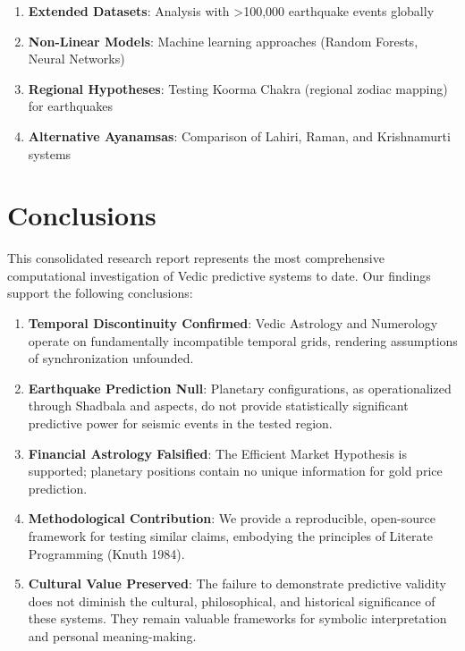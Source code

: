 \documentclass[
  11pt,
  a4paper,
  oneside,
  openany]{article}
\providecommand{\tightlist}{%
  \setlength{\itemsep}{0pt}\setlength{\parskip}{0pt}}\usepackage{longtable,booktabs,array}
\begin{document}
\begin{enumerate}
\def\labelenumi{\arabic{enumi}.}
\tightlist
\item
  \textbf{Extended Datasets}: Analysis with \textgreater100,000
  earthquake events globally
\item
  \textbf{Non-Linear Models}: Machine learning approaches (Random
  Forests, Neural Networks)
\item
  \textbf{Regional Hypotheses}: Testing Koorma Chakra (regional zodiac
  mapping) for earthquakes
\item
  \textbf{Alternative Ayanamsas}: Comparison of Lahiri, Raman, and
  Krishnamurti systems
\end{enumerate}

\section{Conclusions}\label{conclusions}

This consolidated research report represents the most comprehensive
computational investigation of Vedic predictive systems to date. Our
findings support the following conclusions:

\begin{enumerate}
\def\labelenumi{\arabic{enumi}.}
\item
  \textbf{Temporal Discontinuity Confirmed}: Vedic Astrology and
  Numerology operate on fundamentally incompatible temporal grids,
  rendering assumptions of synchronization unfounded.
\item
  \textbf{Earthquake Prediction Null}: Planetary configurations, as
  operationalized through Shadbala and aspects, do not provide
  statistically significant predictive power for seismic events in the
  tested region.
\item
  \textbf{Financial Astrology Falsified}: The Efficient Market
  Hypothesis is supported; planetary positions contain no unique
  information for gold price prediction.
\item
  \textbf{Methodological Contribution}: We provide a reproducible,
  open-source framework for testing similar claims, embodying the
  principles of Literate Programming (Knuth 1984).
\item
  \textbf{Cultural Value Preserved}: The failure to demonstrate
  predictive validity does not diminish the cultural, philosophical, and
  historical significance of these systems. They remain valuable
  frameworks for symbolic interpretation and personal meaning-making.
\end{enumerate}
\end{document}
